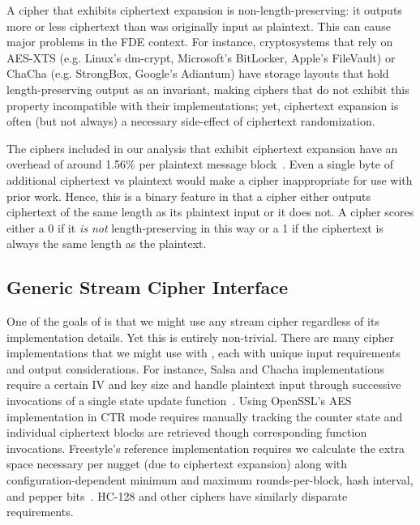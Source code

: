 A cipher that exhibits ciphertext expansion is non-length-preserving: it outputs
more or less ciphertext than was originally input as plaintext. This can cause
major problems in the FDE context. For instance, cryptosystems that rely on
AES-XTS (e.g. Linux's dm-crypt, Microsoft's BitLocker, Apple's FileVault) or
ChaCha (e.g. StrongBox, Google's Adiantum) have storage layouts that hold
length-preserving output as an invariant, making ciphers that do not exhibit
this property incompatible with their implementations; yet, ciphertext expansion
is often (but not always) a necessary side-effect of ciphertext randomization.

The ciphers included in our analysis that exhibit ciphertext expansion have an
overhead of around 1.56\% per plaintext message block~\cite{Freestyle}. Even a
single byte of additional ciphertext vs plaintext would make a cipher
inappropriate for use with prior work. Hence, this is a binary feature in that a
cipher either outputs ciphertext of the same length as its plaintext input or it
does not. A cipher scores either a 0 if it \emph{is not} length-preserving in
this way or a 1 if the ciphertext is always the same length as the plaintext.

\subsection{Generic Stream Cipher Interface} \label{subsec:interface}

One of the goals of \sys is that we might use any stream cipher
regardless of its implementation details. Yet this is entirely non-trivial.
There are many cipher implementations that we might use with \sys, each
with unique input requirements and output considerations. For instance, Salsa
and Chacha implementations require a certain IV and key size and handle
plaintext input through successive invocations of a single state update
function~\cite{Floodyberry}. Using OpenSSL's AES implementation in CTR mode
requires manually tracking the counter state and individual ciphertext blocks
are retrieved though corresponding function invocations. Freestyle's reference
implementation requires we calculate the extra space necessary per nugget (due
to ciphertext expansion) along with configuration-dependent minimum and maximum
rounds-per-block, hash interval, and pepper bits~\cite{Freestyle}. HC-128 and
other ciphers have similarly disparate requirements.

